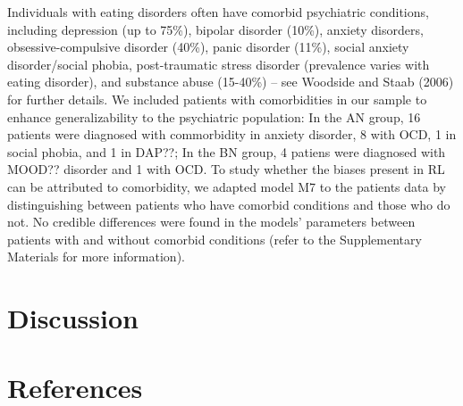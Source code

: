 \documentclass[
  man,floatsintext]{apa6}
\begin{document}
Individuals with eating disorders often have comorbid psychiatric conditions, including depression (up to 75\%), bipolar disorder (10\%), anxiety disorders, obsessive-compulsive disorder (40\%), panic disorder (11\%), social anxiety disorder/social phobia, post-traumatic stress disorder (prevalence varies with eating disorder), and substance abuse (15-40\%) -- see Woodside and Staab (2006) for further details. We included patients with comorbidities in our sample to enhance generalizability to the psychiatric population: In the AN group, 16 patients were diagnosed with commorbidity in anxiety disorder, 8 with OCD, 1 in social phobia, and 1 in DAP??; In the BN group, 4 patiens were diagnosed with MOOD?? disorder and 1 with OCD. To study whether the biases present in RL can be attributed to comorbidity, we adapted model M7 to the patients data by distinguishing between patients who have comorbid conditions and those who do not. No credible differences were found in the models' parameters between patients with and without comorbid conditions (refer to the Supplementary Materials for more information).

\hypertarget{discussion}{%
\section{Discussion}\label{discussion}}

\newpage

\hypertarget{references}{%
\section{References}\label{references}}
\end{document}

